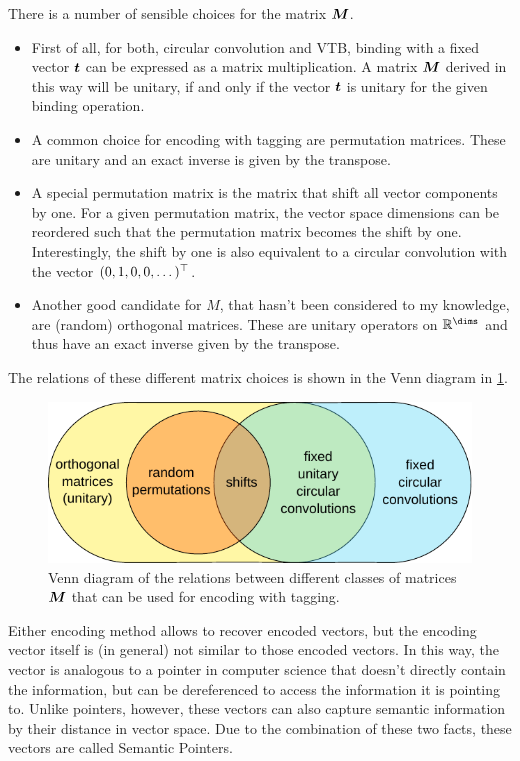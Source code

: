 There is a number of sensible choices for the matrix $\bm{M}$.
\begin{itemize}
    \item First of all, for both, circular convolution and VTB, binding with a fixed vector $\bm{t}$ can be expressed as a matrix multiplication.
        A matrix $\bm{M}$ derived in this way will be unitary, if and only if the vector $\bm{t}$ is unitary for the given binding operation.
    \item A common choice for encoding with tagging are permutation matrices.
        These are unitary and an exact inverse is given by the transpose.
    \item A special permutation matrix is the matrix that shift all vector components by one.
        For a given permutation matrix, the vector space dimensions can be reordered such that the permutation matrix becomes the shift by one.
        Interestingly, the shift by one is also equivalent to a circular convolution with the vector $(0, 1, 0, 0, \dotsc)^{\top}$.
    \item Another good candidate for $M$, that hasn't been considered to my knowledge, are (random) orthogonal matrices.
        These are unitary operators on $\mathbb{R}^{\dims}$ and thus have an exact inverse given by the transpose.
\end{itemize}
The relations of these different matrix choices is shown in the Venn diagram in \cref{fig:tagging-matrices}.
\begin{figure}
    \centering
    \includegraphics{figures/tagging-matrices}
    \caption{Venn diagram of the relations between different classes of matrices $\bm{M}$ that can be used for encoding with tagging.}\label{fig:tagging-matrices}
\end{figure}

Either encoding method allows to recover encoded vectors, but the encoding vector itself is (in general) not similar to those encoded vectors.
In this way, the vector is analogous to a pointer in computer science that doesn't directly contain the information, but can be dereferenced to access the information it is pointing to.
Unlike pointers, however, these vectors can also capture semantic information by their distance in vector space.
Due to the combination of these two facts, these vectors are called Semantic Pointers. 


